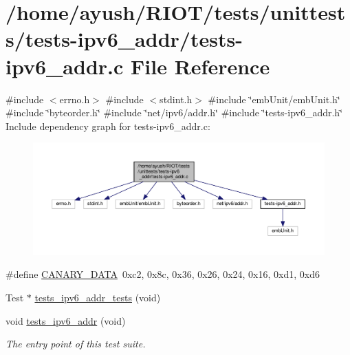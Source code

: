 \hypertarget{tests-ipv6__addr_8c}{}\section{/home/ayush/\+R\+I\+O\+T/tests/unittests/tests-\/ipv6\+\_\+addr/tests-\/ipv6\+\_\+addr.c File Reference}
\label{tests-ipv6__addr_8c}
{\ttfamily \#include $<$errno.\+h$>$}\newline
{\ttfamily \#include $<$stdint.\+h$>$}\newline
{\ttfamily \#include \char`\"{}emb\+Unit/emb\+Unit.\+h\char`\"{}}\newline
{\ttfamily \#include \char`\"{}byteorder.\+h\char`\"{}}\newline
{\ttfamily \#include \char`\"{}net/ipv6/addr.\+h\char`\"{}}\newline
{\ttfamily \#include \char`\"{}tests-\/ipv6\+\_\+addr.\+h\char`\"{}}\newline
Include dependency graph for tests-\/ipv6\+\_\+addr.c\+:
\nopagebreak
\begin{figure}[H]
\begin{center}
\leavevmode
\includegraphics[width=350pt]{tests-ipv6__addr_8c__incl}
\end{center}
\end{figure}
\begin{DoxyCompactItemize}
\item 
\#define \hyperlink{tests-ipv6__addr_8c_ade0f6d6db5f2a80e8d0e63b60cc8b208}{C\+A\+N\+A\+R\+Y\+\_\+\+D\+A\+TA}~0xc2, 0x8c, 0x36, 0x26, 0x24, 0x16, 0xd1, 0xd6
\item 
Test $\ast$ \hyperlink{tests-ipv6__addr_8c_ae297f88d584b1bdc12b64b01bcc3d665}{tests\+\_\+ipv6\+\_\+addr\+\_\+tests} (void)
\item 
void \hyperlink{group__unittests_gaa968d7cf1c200e4ec0394693683d8260}{tests\+\_\+ipv6\+\_\+addr} (void)
\begin{DoxyCompactList}\small\item\em The entry point of this test suite. \end{DoxyCompactList}\end{DoxyCompactItemize}


